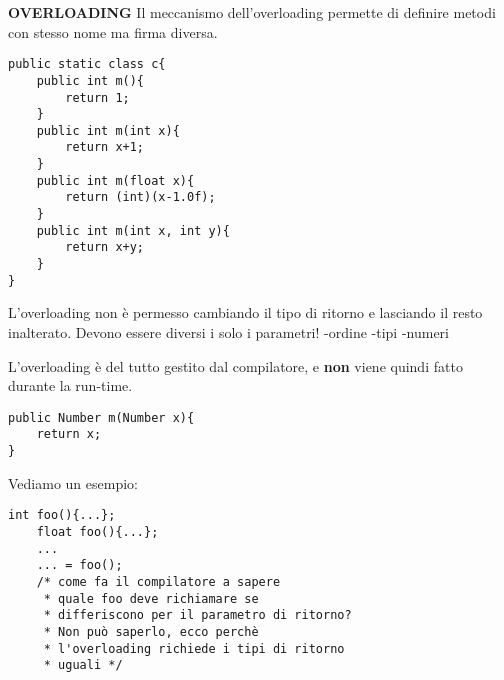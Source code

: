 \noindent \textbf{OVERLOADING} \newline
Il meccanismo dell'overloading permette di definire metodi con stesso nome ma firma diversa. 

\begin{lstlisting}[basicstyle=\small,]
public static class c{
	public int m(){
		return 1;
	}
	public int m(int x){
		return x+1;
	}
	public int m(float x){
		return (int)(x-1.0f);
	}
	public int m(int x, int y){
		return x+y;
	}		
}
\end{lstlisting}

\noindent L'overloading non è permesso cambiando il tipo di ritorno e lasciando il resto inalterato. Devono essere diversi i solo i parametri! \newline
-ordine \newline
-tipi \newline
-numeri \newline

\noindent L'overloading è del tutto gestito dal compilatore, e \textbf{non} viene quindi fatto durante la run-time.

\begin{lstlisting}[basicstyle=\small,]
public Number m(Number x){
	return x;
}
\end{lstlisting}
Vediamo un esempio:
\begin{lstlisting}[basicstyle=\small,]
	int foo(){...};
	float foo(){...};
	...
	... = foo();
	/* come fa il compilatore a sapere
	 * quale foo deve richiamare se 
	 * differiscono per il parametro di ritorno? 
	 * Non può saperlo, ecco perchè 
	 * l'overloading richiede i tipi di ritorno
	 * uguali */
\end{lstlisting}























